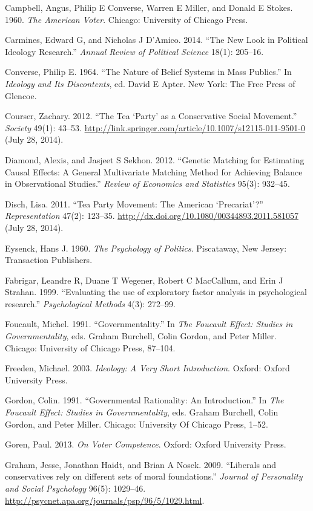\documentclass[12pt,]{article}
\begin{document}
Campbell, Angus, Philip E Converse, Warren E Miller, and Donald E
Stokes. 1960. \emph{The American Voter}. Chicago: University of Chicago
Press.

Carmines, Edward G, and Nicholas J D'Amico. 2014. ``The New Look in
Political Ideology Research.'' \emph{Annual Review of Political Science}
18(1): 205--16.

Converse, Philip E. 1964. ``The Nature of Belief Systems in Mass
Publics.'' In \emph{Ideology and Its Discontents}, ed. David E Apter.
New York: The Free Press of Glencoe.

Courser, Zachary. 2012. ``The Tea `Party' as a Conservative Social
Movement.'' \emph{Society} 49(1): 43--53.
\url{http://link.springer.com/article/10.1007/s12115-011-9501-0} (July
28, 2014).

Diamond, Alexis, and Jasjeet S Sekhon. 2012. ``Genetic Matching for
Estimating Causal Effects: A General Multivariate Matching Method for
Achieving Balance in Observational Studies.'' \emph{Review of Economics
and Statistics} 95(3): 932--45.

Disch, Lisa. 2011. ``Tea Party Movement: The American `Precariat'?''
\emph{Representation} 47(2): 123--35.
\url{http://dx.doi.org/10.1080/00344893.2011.581057} (July 28, 2014).

Eysenck, Hans J. 1960. \emph{The Psychology of Politics}. Piscataway,
New Jersey: Transaction Publishers.

Fabrigar, Leandre R, Duane T Wegener, Robert C MacCallum, and Erin J
Strahan. 1999. ``Evaluating the use of exploratory factor analysis in
psychological research.'' \emph{Psychological Methods} 4(3): 272--99.

Foucault, Michel. 1991. ``Governmentality.'' In \emph{The Foucault
Effect: Studies in Governmentality}, eds. Graham Burchell, Colin Gordon,
and Peter Miller. Chicago: University of Chicago Press, 87--104.

Freeden, Michael. 2003. \emph{Ideology: A Very Short Introduction}.
Oxford: Oxford University Press.

Gordon, Colin. 1991. ``Governmental Rationality: An Introduction.'' In
\emph{The Foucault Effect: Studies in Governmentality}, eds. Graham
Burchell, Colin Gordon, and Peter Miller. Chicago: University Of Chicago
Press, 1--52.

Goren, Paul. 2013. \emph{On Voter Competence}. Oxford: Oxford University
Press.

Graham, Jesse, Jonathan Haidt, and Brian A Nosek. 2009. ``Liberals and
conservatives rely on different sets of moral foundations.''
\emph{Journal of Personality and Social Psychology} 96(5): 1029--46.
\url{http://psycnet.apa.org/journals/psp/96/5/1029.html}.
\end{document}
